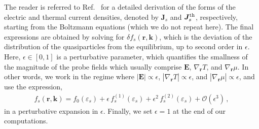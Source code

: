 \documentclass[aps,prb,onecolumn,nofootinbib,citeautoscript,10pt]{revtex4-2}
\newcommand{\bs}[1]{\boldsymbol{#1}}
\begin{document}
The reader is referred to Ref.~\cite{ips-shreya} for a detailed derivation of the forms of the electric and thermal current densities, denoted by ${\bs J}_s$ and ${\bs J}_s^{\rm th}$, respectively, starting from the Boltzmann equations (which we do not repeat here). The final expressions are obtained by solving for $ \delta  f_s (\bs r,\bs k)$, which is the deviation of the distribution of the quasiparticles from the equilibrium, up to second order in $\epsilon $. Here, $\epsilon \in [0, 1 ] $ is a perturbative parameter, which quantifies the smallness of the magnitude of the probe fields which usually comprise $\bs E  $, $\nabla_{\bs r} T $, and $\nabla_{\bs r} \mu $. In other words, we work in the regime where $ |\bs E| \propto \epsilon  $, $ |\nabla_{\bs r} T |  \propto \epsilon$, and $ |\nabla_{\bs r} \mu |  \propto \epsilon$, and use the expression,
\begin{align}
f_s (\bs r,\bs k)
=  f_0  (\varepsilon_s) + \epsilon \, f_s^{(1)}  (\varepsilon_s) 
+ \epsilon^2 \, f_s^{(2)}  (\varepsilon_s) 
+ \mathcal{O}(\epsilon^3)\,,
\end{align}
in a perturbative expansion in $\epsilon$. Finally, we set $\epsilon = 1 $ at the end of our computations.
\end{document}
